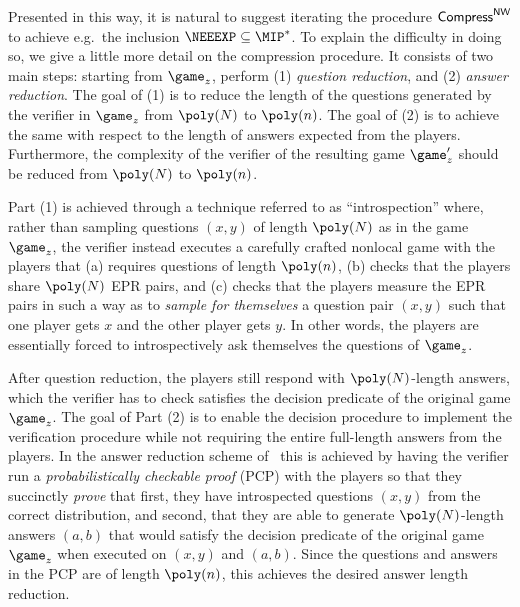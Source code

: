 Presented in this way, it is natural to suggest iterating the procedure $\mathsf{Compress}^{\mathsf{NW}}$ to achieve e.g.\ the inclusion $\NEEEXP \subseteq \MIP^*$. To explain the difficulty in doing so, we give a little more detail on the compression procedure. It consists of two main steps: starting from $\game_z$, perform (1) \emph{question reduction}, and (2) \emph{answer reduction}. The goal of (1) is to reduce the length of the questions generated by the verifier in $\game_z$ from $\poly(N)$ to $\poly(n)$. The goal of (2) is to achieve the same with respect to the length of answers expected from the players. Furthermore, the complexity of the verifier of the resulting game $\game_z'$ should be reduced from $\poly(N)$ to  $\poly(n)$.
	
	Part (1) is achieved through a technique referred to as ``introspection'' where, rather than sampling questions $(x,y)$ of length $\poly(N)$ as in the game $\game_z$, the verifier instead executes a carefully crafted nonlocal game with the players that (a) requires questions of length $\poly(n)$, (b) checks that the players share $\poly(N)$ EPR pairs, and (c) checks that the players measure the EPR pairs in such a way as to \emph{sample for themselves} a question pair $(x,y)$ such that one player gets $x$ and the other player gets $y$. In other words, the players are essentially forced to introspectively ask themselves the questions of $\game_z$. 
	
	After question reduction, the players still respond with $\poly(N)$-length answers, which the verifier has to check satisfies the decision predicate of the original game $\game_z$. The goal of Part (2) is to enable the decision procedure to implement the verification procedure while not requiring the entire full-length answers from the players. In the answer reduction scheme of~\cite{NW19} this is achieved by having the verifier run a \emph{probabilistically checkable proof} (PCP) with the players so that they succinctly \emph{prove} that first, they have introspected questions $(x,y)$ from the correct distribution, and second, that they are able to generate $\poly(N)$-length answers $(a,b)$ that would satisfy the decision predicate of the original game $\game_z$ when executed on $(x,y)$ and $(a,b)$. Since the questions and answers in the PCP are of length $\poly(n)$, this achieves the desired answer length reduction.
	
